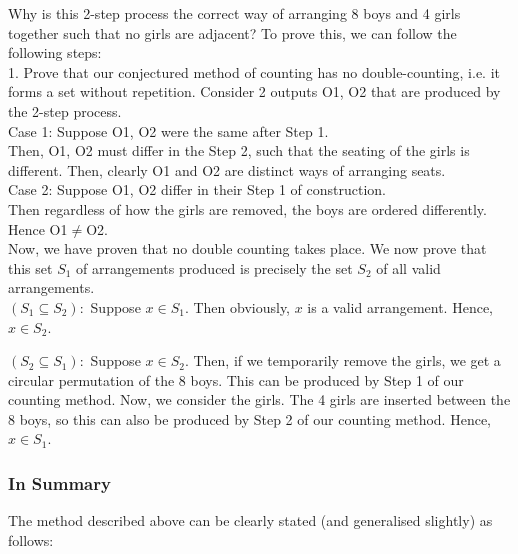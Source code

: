 \documentclass{article}
\begin{document}
Why is this 2-step process the correct way of arranging 8 boys and 4 girls together such that no girls are adjacent?
To prove this, we can follow the following steps:\\
1. Prove that our conjectured method of counting has no double-counting, i.e. it forms a set without repetition.
Consider 2 outputs O1, O2 that are produced by the 2-step process.\\
Case 1: Suppose O1, O2 were the same after Step 1.\\
Then, O1, O2 must differ in the Step 2, such that the seating of the girls is different. Then, clearly O1 and O2 are distinct ways of arranging seats.\\
Case 2: Suppose O1, O2 differ in their Step 1 of construction.\\
Then regardless of how the girls are removed, the boys are ordered differently. Hence O1$\neq$O2.\\
Now, we have proven that no double counting takes place. We now prove that this set $S_1$ of arrangements produced is precisely the set $S_2$ of all valid arrangements.\\
$(S_1\subseteq S_2):$
Suppose $x\in S_1$. Then obviously, $x$ is a valid arrangement. Hence, $x\in S_2$.

$(S_2\subseteq S_1):$
Suppose $x\in S_2$. Then, if we temporarily remove the girls, we get a circular permutation of the 8 boys. This can be produced by Step 1 of our counting method. Now, we consider the girls. The 4 girls are inserted between the 8 boys, so this can also be produced by Step 2 of our counting method. Hence, $x\in S_1$.

\subsubsection{In Summary}
The method described above can be clearly stated (and generalised slightly) as follows:
\end{document}
